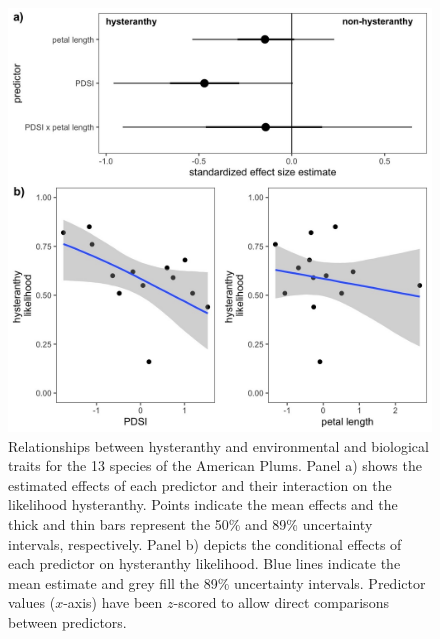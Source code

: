 \documentclass{article}[12pt]
\begin{document}
{\begin{figure}[h!]
    \label{fig:ordinals}
\end{figure}


\begin{figure}[h!]
    \centering
 \includegraphics[width=\textwidth]{..//..//Plots/whatReviwerswant/hypoth_preds.jpeg}
    \caption{Relationships between hysteranthy and environmental and biological traits for the 13 species of the American Plums. Panel a) shows the estimated effects of each predictor and their interaction on the likelihood hysteranthy. Points indicate the mean effects and the thick and thin bars represent the 50\% and 89\% uncertainty intervals, respectively. Panel b) depicts the conditional effects of each predictor on hysteranthy likelihood. Blue lines indicate the mean estimate and grey fill the 89\% uncertainty intervals.  Predictor values ($x$-axis) have been $z$-scored to allow direct comparisons between predictors.}
    \label{fig:prunes}
\end{figure}



}
\end{document}
